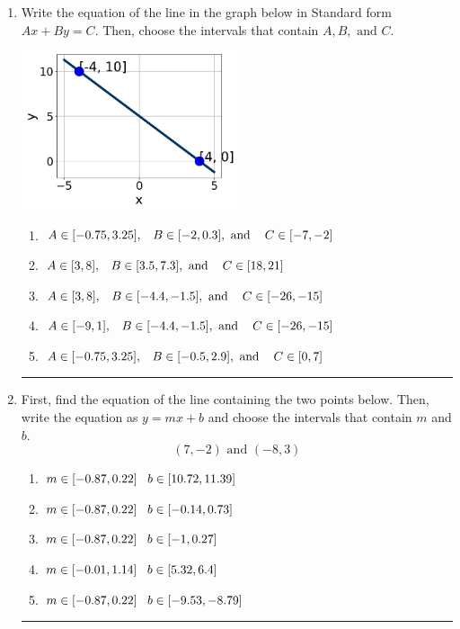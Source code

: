 \documentclass[14pt]{extbook}
\newcommand{\litem}[1]{\item#1\hspace*{-1cm}\rule{\textwidth}{0.4pt}}
\begin{document}
\begin{enumerate}
{\begin{enumerate}[label=\Alph*.]
\end{enumerate} }
\litem{
Write the equation of the line in the graph below in Standard form $Ax+By=C$. Then, choose the intervals that contain $A, B, \text{ and } C$.
\begin{center}
    \includegraphics[width=0.5\textwidth]{../Figures/linearGraphToStandardA.png}
\end{center}
\begin{enumerate}[label=\Alph*.]
\item \( A \in [-0.75, 3.25], \hspace{3mm} B \in [-2, 0.3], \text{ and } \hspace{3mm} C \in [-7, -2] \)
\item \( A \in [3, 8], \hspace{3mm} B \in [3.5, 7.3], \text{ and } \hspace{3mm} C \in [18, 21] \)
\item \( A \in [3, 8], \hspace{3mm} B \in [-4.4, -1.5], \text{ and } \hspace{3mm} C \in [-26, -15] \)
\item \( A \in [-9, 1], \hspace{3mm} B \in [-4.4, -1.5], \text{ and } \hspace{3mm} C \in [-26, -15] \)
\item \( A \in [-0.75, 3.25], \hspace{3mm} B \in [-0.5, 2.9], \text{ and } \hspace{3mm} C \in [0, 7] \)

\end{enumerate} }
\litem{
First, find the equation of the line containing the two points below. Then, write the equation as $ y=mx+b $ and choose the intervals that contain $m$ and $b$.\[ (7, -2) \text{ and } (-8, 3) \]\begin{enumerate}[label=\Alph*.]
\item \( m \in [-0.87, 0.22] \hspace*{3mm} b \in [10.72, 11.39] \)
\item \( m \in [-0.87, 0.22] \hspace*{3mm} b \in [-0.14, 0.73] \)
\item \( m \in [-0.87, 0.22] \hspace*{3mm} b \in [-1, 0.27] \)
\item \( m \in [-0.01, 1.14] \hspace*{3mm} b \in [5.32, 6.4] \)
\item \( m \in [-0.87, 0.22] \hspace*{3mm} b \in [-9.53, -8.79] \)


\end{enumerate}}
\end{enumerate}
\end{document}
